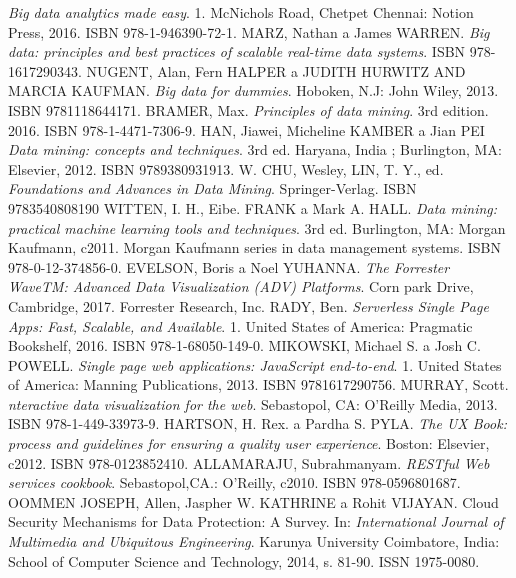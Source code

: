 \begin{thebibliography}{99}
\textit{Big data analytics made easy}.
1. McNichols Road, Chetpet Chennai: Notion Press, 2016. ISBN 978-1-946390-72-1.
MARZ, Nathan a James WARREN.
\textit{Big data: principles and best practices of scalable real-time data systems}.
ISBN 978-1617290343.
NUGENT, Alan, Fern HALPER a JUDITH HURWITZ AND MARCIA KAUFMAN.
\textit{Big data for dummies}.
Hoboken, N.J: John Wiley, 2013. ISBN 9781118644171.
BRAMER, Max.
\textit{Principles of data mining}.
3rd edition. 2016. ISBN 978-1-4471-7306-9.
HAN, Jiawei, Micheline KAMBER a Jian PEI
\textit{Data mining: concepts and techniques}.
3rd ed. Haryana, India ; Burlington, MA: Elsevier, 2012. ISBN 9789380931913.
W. CHU, Wesley, LIN, T. Y., ed. 
\textit{Foundations and Advances in Data Mining}.
Springer-Verlag. ISBN 9783540808190
WITTEN, I. H., Eibe. FRANK a Mark A. HALL.
\textit{Data mining: practical machine learning tools and techniques}.
3rd ed. Burlington, MA: Morgan Kaufmann, c2011. Morgan Kaufmann series in data management systems. ISBN 978-0-12-374856-0.
EVELSON, Boris a Noel YUHANNA.
\textit{The Forrester WaveTM: Advanced Data Visualization (ADV) Platforms}.
Corn park Drive, Cambridge, 2017. Forrester Research, Inc.
RADY, Ben.
\textit{Serverless Single Page Apps: Fast, Scalable, and Available}.
1. United States of America: Pragmatic Bookshelf, 2016. ISBN 978-1-68050-149-0.
MIKOWSKI, Michael S. a Josh C. POWELL.
\textit{Single page web applications: JavaScript end-to-end}.
1. United States of America: Manning Publications, 2013. ISBN 9781617290756.
MURRAY, Scott.
\textit{nteractive data visualization for the web}.
Sebastopol, CA: O'Reilly Media, 2013. ISBN 978-1-449-33973-9.
HARTSON, H. Rex. a Pardha S. PYLA.
\textit{The UX Book: process and guidelines for ensuring a quality user experience}.
Boston: Elsevier, c2012. ISBN 978-0123852410.
ALLAMARAJU, Subrahmanyam.
\textit{RESTful Web services cookbook}.
Sebastopol,CA.: O'Reilly, c2010. ISBN 978-0596801687.
OOMMEN JOSEPH, Allen, Jaspher W. KATHRINE a Rohit VIJAYAN.
Cloud Security Mechanisms for Data Protection: A Survey. In: \textit{International Journal of Multimedia and Ubiquitous Engineering}.
Karunya University Coimbatore, India: School of Computer Science and Technology, 2014, s. 81-90. ISSN 1975-0080.

\end{thebibliography}
